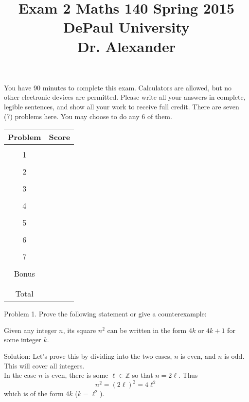 \documentclass[16 pt]{amsart}
\theoremstyle{definition}
\theoremstyle{remark}
\numberwithin{equation}{subsection}
\newcommand{\Z}{\mathbb{Z}}
\begin{document}
\title{Exam 2 Maths 140 Spring 2015 \\ DePaul University\\Dr. Alexander}
\maketitle
You have 90 minutes to complete this exam.  Calculators are allowed, but no other electronic devices are permitted.  Please write all your answers in complete, legible sentences, and show all your work to receive full credit.  There are seven (7) problems here.  You may choose to do any 6 of them.  
\vspace{1in}


\begin{center}
  \begin{tabular}{ c | c }
    Problem & Score\\
    \hline
    &\\
    1&\\
    &\\
    2&\\
    &\\
    3&\\
    &\\
    4&\\
    &\\
    5&\\
    &\\
    6&\\
    &\\
    7&\\
    &\\
    Bonus&\\
    &\\
    \hline 
    &\\    
    Total& 
 \end{tabular}
\end{center}

\newpage 
Problem 1. Prove the following statement or give a counterexample:

Given any integer $n$, its square $n^2$ can be written in the form $4k$ or $4k+1$ for some integer $k$.

\vspace{1in}

Solution: Let's prove this by dividing into the two cases, $n$ is even, and $n$ is odd.  This will cover all integers.\\

In the case $n$ is even, there is some $\ell \in \Z$ so that $n=2\ell.$  Thus
\[
n^2 = (2\ell)^2 = 4\ell^2 
\]
which is of the form $4k$ ($k=\ell^2$).\\
\end{document}
